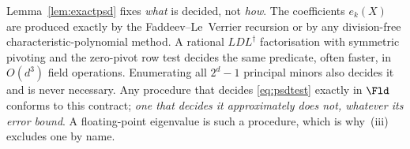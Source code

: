 
\begin{remark}
\label{rem:psdalgorithm}
Lemma~\ref{lem:exactpsd} fixes \emph{what} is decided, not \emph{how}. The
coefficients $e_k(X)$ are produced exactly by the Faddeev--Le~Verrier
recursion or by any division-free characteristic-polynomial method. A
rational $LDL^{\dagger}$ factorisation with symmetric pivoting and the
zero-pivot row test decides the same predicate, often faster, in $O(d^{3})$
field operations. Enumerating all $2^{d}-1$ principal minors also decides it
and is never necessary. Any procedure that decides \eqref{eq:psdtest} exactly
in $\Fld$ conforms to this contract; \emph{one that decides it approximately
does not, whatever its error bound}. A floating-point eigenvalue is such a
procedure, which is why \,(iii) excludes
one by name.
\end{remark}
